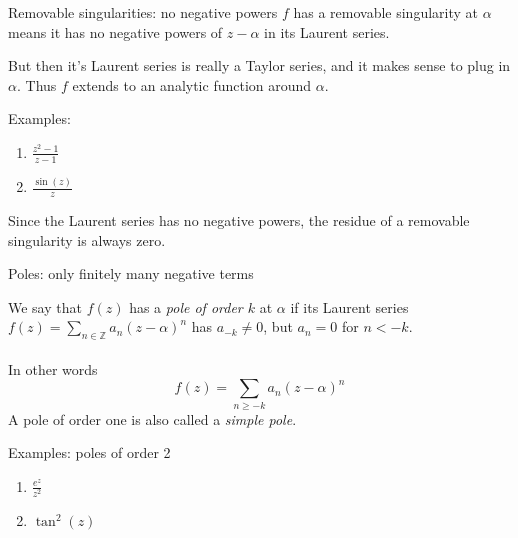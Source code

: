 \documentclass{beamer}
\newcommand{\Z}{\mathbb{Z}}
\begin{document}
\begin{frame}{Removable singularities: no negative powers}
$f$ has a removable singularity at $\alpha$ means it has no negative powers of $z-\alpha$ in its Laurent series.  

But then it's Laurent series is really a Taylor series, and it makes sense to plug in $\alpha$.  Thus $f$ extends to an analytic function around $\alpha$.  
\begin{block}{Examples:}
\begin{enumerate}
\item $\frac{z^2-1}{z-1}$
\item $\frac{\sin(z)}{z}$
\end{enumerate}
\end{block}

Since the Laurent series has no negative powers, the residue of a removable singularity is always zero.
\end{frame}


\begin{frame}{Poles: only finitely many negative terms}
\begin{definition}
We say that $f(z)$ has a \emph{pole of order $k$} at $\alpha$ if its Laurent series $f(z)=\sum_{n\in\Z} a_n(z-\alpha)^n$ has $a_{-k}\neq 0$, but $a_{n}=0$ for $n<-k$.
\\ ~ \\
In other words
$$f(z)=\sum_{n\geq -k} a_n (z-\alpha)^n$$
A pole of order one is also called a \emph{simple pole}.
\end{definition}
\begin{block}{Examples: poles of order 2} 
\begin{enumerate}
    \item $\frac{e^z}{z^2}$
    \item $\tan^2(z)$
  \end{enumerate}
\end{block}


\end{frame}
\end{document}
